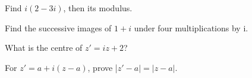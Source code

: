 \documentclass[11pt]{article}
\begin{document}
Find \(i(2-3i)\), then its modulus.\par
\vspace{5pt}
Find the successive images of \(1+i\) under four multiplications by i.\par
\vspace{5pt}
What is the centre of \(z'=i z+2\)?\par
\vspace{5pt}
For \(z'=a+i(z-a)\), prove |\(z'-a|=|z-a|\).\par
\vspace{5pt}
\end{document}
